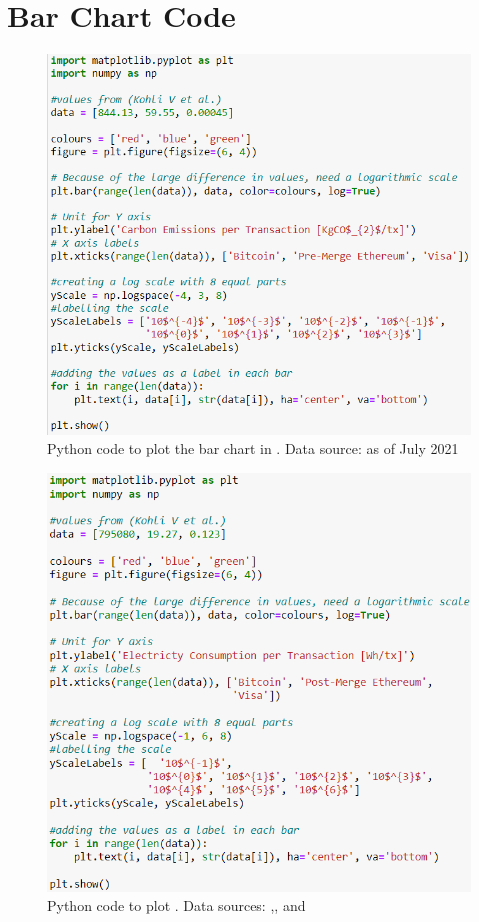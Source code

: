 \chapter{Bar Chart Code}

\begin{figure}[h]
    \centering
    \includegraphics[width=13cm,center]{Figures/CarbonEmissionsPlotCode.png}
    \caption{Python code to plot the bar chart in . Data source: \cite{Kohli2023AnSolutions} as of July 2021}
    \label{Figure:CarbonEmissionsPlotCode}
\end{figure}


\begin{figure}[h]
    \centering
    \includegraphics[width=13cm,center]{Figures/ElectrictyConsumptionPlotCode.png}
    \caption{Python code to plot . Data sources: \cite{VisaHome},\cite{2022VisaReport},\cite{BitcoinDigiconomist}  and  }
    \label{Figure:ElectrictyConsumptionPlotCode}
\end{figure}

